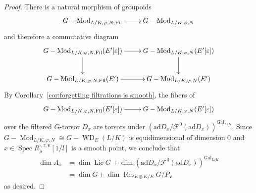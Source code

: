 \documentclass{amsart}
\DeclareMathOperator{\Lie}{Lie}
\def\ad{\mathrm{ad}}
\theoremstyle{definition}
\theoremstyle{remark}
\DeclareMathOperator{\Fil}{Fil}
\DeclareMathOperator{\Gal}{Gal}
\DeclareMathOperator{\Mod}{Mod}
\DeclareMathOperator{\Spec}{Spec}
\DeclareMathOperator{\WD}{WD}
\newcommand{\rhobar}{\overline{\rho}}
\newcommand{\Res}{\operatorname{Res}}
\begin{document}
\begin{proof}
There is a natural morphism of groupoids
\[
\xymatrix{
G-\Mod_{L/K,\varphi,N,\Fil}\ar[r] & G-\Mod_{L/K,\varphi,N}	}	\]
and therefore a commutative diagram
\[	\xymatrix{
G-\Mod_{L/K,\varphi,N,\Fil}(E'[\varepsilon])\ar[r]\ar[d] & G-\Mod_{L/K,\varphi,N}(E'[\varepsilon])\ar[d]	\\
G-\Mod_{L/K,\varphi,N,\Fil}(E')\ar[r] & G-\Mod_{L/K,\varphi,N}(E')
}	\]
By Corollary~\ref{cor:forgetting filtrations is smooth}, the fibers of \[
\xymatrix{
G-\Mod_{L/K,\varphi,N,\Fil}(E'[\varepsilon])\ar[r] & G-\Mod_{L/K,\varphi,N}(E'[\varepsilon])	}	\]
over the filtered $G$-torsor $D_x$ are torsors under $\left(\ad D_x/\mathcal{F}^0(\ad D_x)\right)^{\Gal_{L/K}}$.  Since $G-\Mod_{L/K,\varphi,N}\cong G-\WD_{E}(L/K)$ is equidimensional of dimension $0$ and $x\in\Spec R_{\rhobar}^{\square,\tau,\mathbf{v}}[1/l]$ is a smooth point, we conclude that
\begin{align*}
\dim A_x&=\dim \Lie G+\dim \left(\ad D_x/\mathcal{F}^0(\ad D_x)\right)^{\Gal_{L/K}} 	\\
&= \dim G+ \dim\Res_{E\otimes K/E}G/P_{\mathbf{v}}
\end{align*}
as desired.


\end{proof}
\end{document}

